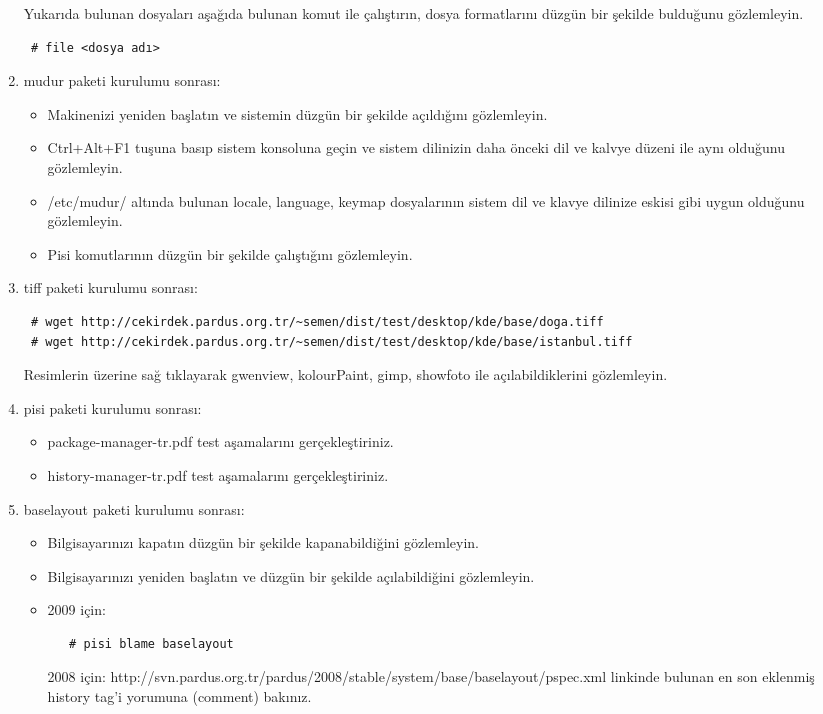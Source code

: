 \documentclass[a4paper,10pt]{article}
\begin{document}
\begin{enumerate}
Yukarıda bulunan dosyaları aşağıda bulunan komut ile çalıştırın, dosya formatlarını düzgün bir şekilde bulduğunu gözlemleyin.
\begin{verbatim}
 # file <dosya adı>
\end{verbatim}

\item mudur paketi kurulumu sonrası:

\begin{itemize}
  \item Makinenizi yeniden başlatın ve sistemin düzgün bir şekilde açıldığını  gözlemleyin.
 \item Ctrl+Alt+F1 tuşuna basıp sistem konsoluna geçin ve sistem dilinizin daha önceki dil ve kalvye düzeni ile aynı olduğunu gözlemleyin.
  \item /etc/mudur/ altında bulunan locale, language, keymap dosyalarının sistem dil ve klavye dilinize eskisi gibi uygun olduğunu gözlemleyin.
 \item Pisi komutlarının düzgün bir şekilde çalıştığını gözlemleyin. 

\end{itemize}
\item tiff paketi kurulumu sonrası:
\begin{verbatim}
 # wget http://cekirdek.pardus.org.tr/~semen/dist/test/desktop/kde/base/doga.tiff
 # wget http://cekirdek.pardus.org.tr/~semen/dist/test/desktop/kde/base/istanbul.tiff
\end{verbatim}

Resimlerin üzerine sağ tıklayarak gwenview, kolourPaint, gimp, showfoto ile açılabildiklerini gözlemleyin.
\item pisi paketi kurulumu sonrası:
\begin{itemize}
 \item package-manager-tr.pdf test aşamalarını gerçekleştiriniz.
 \item history-manager-tr.pdf test aşamalarını gerçekleştiriniz.
\end{itemize}
\item baselayout paketi kurulumu sonrası:
\begin{itemize}
 \item Bilgisayarınızı kapatın düzgün bir şekilde kapanabildiğini gözlemleyin.
 \item Bilgisayarınızı yeniden başlatın ve düzgün bir şekilde açılabildiğini gözlemleyin.
 \item 2009 için:
  \begin{verbatim}
   # pisi blame baselayout
  \end{verbatim}
      2008 için: http://svn.pardus.org.tr/pardus/2008/stable/system/base/baselayout/pspec.xml linkinde bulunan en son eklenmiş history tag'i yorumuna (comment) bakınız.


\end{itemize}
\end{enumerate}
\end{document}
